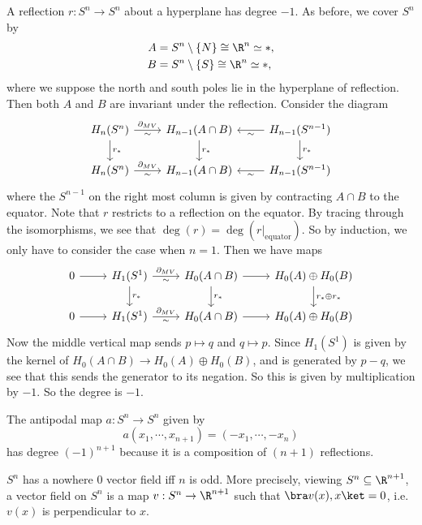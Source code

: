 \documentclass[a4paper]{article}
\theoremstyle{definition}
\begin{document}
\begin{prop}
  A reflection $r: S^n \to S^n$ about a hyperplane has degree $-1$. As before, we cover $S^n$ by
  \begin{align*}
    A &= S^n \setminus \{N\} \cong \R^n \simeq *,\\
    B &= S^n \setminus \{S\} \cong \R^n \simeq *,
  \end{align*}
  where we suppose the north and south poles lie in the hyperplane of reflection. Then both $A$ and $B$ are invariant under the reflection. Consider the diagram
  \[
    \begin{tikzcd}
      H_n(S^n) \ar[r, "\partial_{MV}", "\sim"'] \ar[d, "r_*"] & H_{n - 1}(A \cap B) \ar[d, "r_*"] & H_{n - 1}(S^{n - 1}) \ar[l, "\sim"] \ar[d, "r_*"]\\
      H_n(S^n) \ar[r, "\partial_{MV}", "\sim"'] & H_{n - 1}(A \cap B) & H_{n - 1}(S^{n - 1}) \ar[l, "\sim"]
    \end{tikzcd}
  \]
  where the $S^{n - 1}$ on the right most column is given by contracting $A \cap B$ to the equator. Note that $r$ restricts to a reflection on the equator. By tracing through the isomorphisms, we see that $\deg(r) = \deg(r|_{\mathrm{equator}})$. So by induction, we only have to consider the case when $n = 1$. Then we have maps
  \[
    \begin{tikzcd}
      0 \ar[r] & H_1(S^1) \ar[r, "\partial_{MV}", "\sim"'] \ar[d, "r_*"] & H_0(A \cap B) \ar[d, "r_*"] \ar[r] & H_0(A) \oplus H_0(B) \ar[d, "r_* \oplus r_*"]\\
      0 \ar[r] & H_1(S^1) \ar[r, "\partial_{MV}", "\sim"'] & H_0(A \cap B) \ar[r] & H_0(A) \oplus H_0(B)
    \end{tikzcd}
  \]
  Now the middle vertical map sends $p \mapsto q$ and $q \mapsto p$. Since $H_1(S^1)$ is given by the kernel of $H_0(A \cap B) \to H_0(A) \oplus H_0(B)$, and is generated by $p - q$, we see that this sends the generator to its negation. So this is given by multiplication by $-1$. So the degree is $-1$.
\end{prop}

\begin{cor}
  The antipodal map $a: S^n \to S^n$ given by
  \[
    a(x_1, \cdots, x_{n + 1}) = (-x_1, \cdots, -x_n)
  \]
  has degree $(-1)^{n + 1}$ because it is a composition of $(n + 1)$ reflections.
\end{cor}

\begin{cor}
  $S^n$ has a nowhere $0$ vector field iff $n$ is odd. More precisely, viewing $S^n \subseteq \R^{n + 1}$, a vector field on $S^n$ is a map $v: S^n \to \R^{n + 1}$ such that $\bra v(x), x\ket = 0$, i.e.\ $v(x)$ is perpendicular to $x$.
\end{cor}
\end{document}
